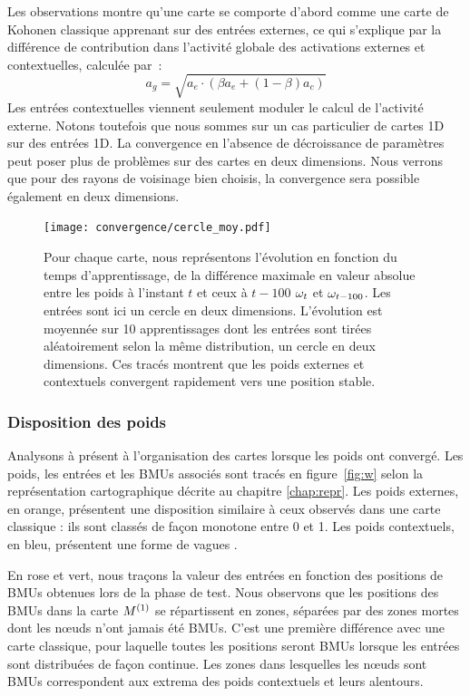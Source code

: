 \documentclass[../main]{subfiles}
\begin{document}
Les observations montre qu'une carte se comporte d'abord comme une carte de Kohonen classique apprenant sur des entrées externes, ce qui s'explique par la différence de contribution dans l'activité globale des activations externes et contextuelles, calculée par~: 
$$ a_g = \sqrt{a_e \cdot (\beta a_e + (1-\beta)a_c)}$$
Les entrées contextuelles viennent seulement moduler le calcul de l'activité externe.
Notons toutefois que nous sommes sur un cas particulier de cartes 1D sur des entrées 1D.
La convergence en l'absence de décroissance de paramètres peut poser plus de problèmes sur des cartes en deux dimensions. 
Nous verrons que pour des rayons de voisinage bien choisis, la convergence sera possible également en deux dimensions.

\begin{figure}[h!]
	\texttt{[image: convergence/cercle\_moy.pdf]}
	\caption{Pour chaque carte, nous représentons l'évolution en fonction du temps d'apprentissage, de la différence maximale en valeur absolue entre les poids à l'instant $t$ et ceux à $t-100$ $\omega_t$ et $\omega_{t-100}$. Les entrées sont ici un cercle en deux dimensions. L'évolution est moyennée sur 10 apprentissages dont les entrées sont tirées aléatoirement selon la même distribution, un cercle en deux dimensions.
	Ces tracés montrent que les poids externes et contextuels convergent rapidement vers une position stable.\label{fig:conv}}
\end{figure}


\subsubsection{Disposition des poids}

Analysons à présent à l'organisation des cartes lorsque les poids ont convergé.
Les poids, les entrées et les BMUs associés sont tracés en figure~\ref{fig:w} selon la représentation cartographique décrite au chapitre \ref{chap:repr}.
Les poids externes, en orange, présentent une disposition similaire à ceux observés dans une carte classique : ils sont classés de façon monotone entre 0 et 1.
Les poids contextuels, en bleu, présentent une forme de \og vagues \fg{}. 

En rose et vert, nous traçons la valeur des entrées en fonction des positions de BMUs obtenues lors de la phase de test.
Nous observons que les positions des BMUs dans la carte $M^{({1})}$ se répartissent en zones, séparées par des zones mortes dont les n\oe{}uds n'ont jamais été BMUs. C'est une première différence avec une carte classique, pour laquelle toutes les positions seront BMUs lorsque les entrées sont distribuées de façon continue.
Les zones dans lesquelles les n\oe{}uds sont BMUs correspondent aux extrema des poids contextuels et leurs alentours.
\end{document}
